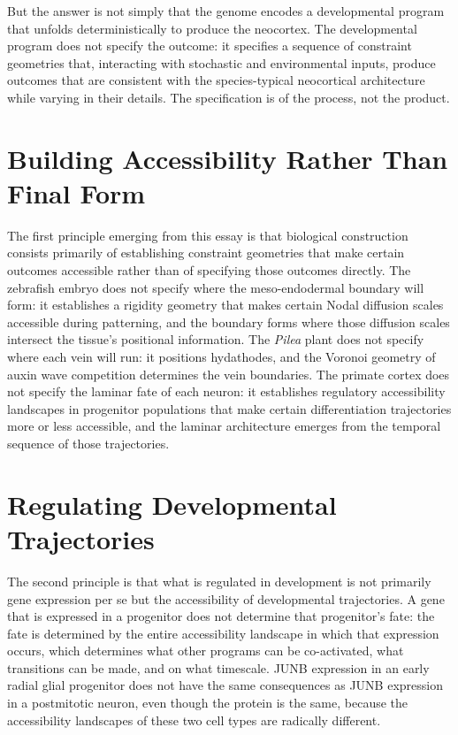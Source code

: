 \documentclass[12pt, a4paper, openany]{book}
\theoremstyle{definition}
\theoremstyle{remark}
\begin{document}
But the answer is not simply that the genome encodes a developmental program that unfolds deterministically to produce the neocortex. The developmental program does not specify the outcome: it specifies a sequence of constraint geometries that, interacting with stochastic and environmental inputs, produce outcomes that are consistent with the species-typical neocortical architecture while varying in their details. The specification is of the process, not the product.

\section{Building Accessibility Rather Than Final Form}

The first principle emerging from this essay is that biological construction consists primarily of establishing constraint geometries that make certain outcomes accessible rather than of specifying those outcomes directly. The zebrafish embryo does not specify where the meso-endodermal boundary will form: it establishes a rigidity geometry that makes certain Nodal diffusion scales accessible during patterning, and the boundary forms where those diffusion scales intersect the tissue's positional information. The \textit{Pilea} plant does not specify where each vein will run: it positions hydathodes, and the Voronoi geometry of auxin wave competition determines the vein boundaries. The primate cortex does not specify the laminar fate of each neuron: it establishes regulatory accessibility landscapes in progenitor populations that make certain differentiation trajectories more or less accessible, and the laminar architecture emerges from the temporal sequence of those trajectories.

\section{Regulating Developmental Trajectories}

The second principle is that what is regulated in development is not primarily gene expression per se but the accessibility of developmental trajectories. A gene that is expressed in a progenitor does not determine that progenitor's fate: the fate is determined by the entire accessibility landscape in which that expression occurs, which determines what other programs can be co-activated, what transitions can be made, and on what timescale. JUNB expression in an early radial glial progenitor does not have the same consequences as JUNB expression in a postmitotic neuron, even though the protein is the same, because the accessibility landscapes of these two cell types are radically different.
\end{document}
